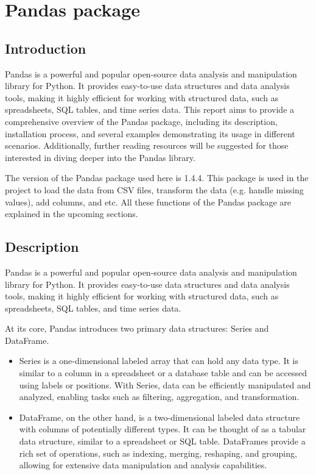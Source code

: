%
%




\chapter{Pandas package}


\section{Introduction}

Pandas is a powerful and popular open-source data analysis and manipulation library for Python. It provides easy-to-use data structures and data analysis tools, making it highly efficient for working with structured data, such as spreadsheets, SQL tables, and time series data.
This report aims to provide a comprehensive overview of the Pandas package, including its description, installation process, and several examples demonstrating its usage in different scenarios. Additionally, further reading resources will be suggested for those interested in diving deeper into the Pandas library. 

The version of the Pandas package used here is 1.4.4. This package is used in the project to load the data from CSV files, transform the data (e.g. handle missing values), add columns, and etc. All these functions of the Pandas package are explained in the upcoming sections.

\section{Description}

Pandas is a powerful and popular open-source data analysis and manipulation library for Python. It provides easy-to-use data structures and data analysis tools, making it highly efficient for working with structured data, such as spreadsheets, SQL tables, and time series data.

At its core, Pandas introduces two primary data structures: Series and DataFrame. 

\begin{itemize}
	\item Series is a one-dimensional labeled array that can hold any data type. It is similar to a column in a spreadsheet or a database table and can be accessed using labels or positions. With Series, data can be efficiently manipulated and analyzed, enabling tasks such as filtering, aggregation, and transformation.
	
	\item DataFrame, on the other hand, is a two-dimensional labeled data structure with columns of potentially different types. It can be thought of as a tabular data structure, similar to a spreadsheet or SQL table. DataFrames provide a rich set of operations, such as indexing, merging, reshaping, and grouping, allowing for extensive data manipulation and analysis capabilities.
\end{itemize}

